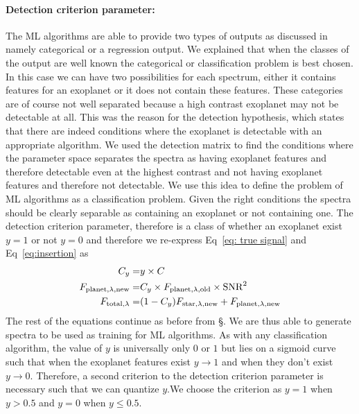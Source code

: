 \paragraph{Detection criterion parameter:\\}
The ML algorithms are able to provide two types of outputs as discussed in  namely categorical or a regression output.
We explained that when the classes of the output are well known the categorical or classification problem is best chosen.
In this case we can have two possibilities for each spectrum, either it contains features for an exoplanet or it does not contain these features. 
These categories are of course not well separated because a high contrast exoplanet may not be detectable at all.
This was the reason for the detection hypothesis, which states that there are indeed conditions where the exoplanet is detectable with an appropriate algorithm.
We used the detection matrix to find the conditions where the parameter space separates the spectra as having exoplanet features and therefore detectable even at the highest contrast and not having exoplanet features and therefore not detectable.
We use this idea to define the problem of ML algorithms as a classification problem. 
Given the right conditions the spectra should be clearly separable as containing an exoplanet or not containing one.
The detection criterion parameter, therefore is a class of whether an exoplanet exist $y=1$ or not $y=0$ and therefore we re-express Eq~\ref{eq: true signal} and Eq~\ref{eq:insertion} as 
\begin{eqnarray}
    C_y =& y\times C\\
    F_{\rm{planet},\lambda,new} =& C_y\times F_{\rm{planet},\lambda,old}\times \rm{SNR}^2\\
    F_{\rm{total},\lambda} =& (1-C_y)F_{\rm{star},\lambda,new} + F_{\rm{planet},\lambda,new}
    \label{eq:ML_detect_eqn}
\end{eqnarray}
The rest of the equations continue as before from §.
We are thus able to generate spectra to be used as training for ML algorithms.
As with any classification algorithm, the value of $y$ is universally only $0$ or $1$ but lies on a sigmoid curve such that when the exoplanet features exist $y\to 1$ and when they don't exist $y\to0$.
Therefore, a second criterion to the detection criterion parameter is necessary such that we can quantize $y$.We choose the criterion as $y =1$ when $y>0.5$ and $y=0$ when $y\le 0.5$.


